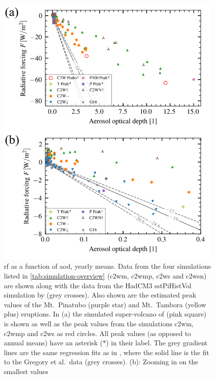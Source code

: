 \documentclass[twocol]{ametsocV6.1}
\begin{document}
\begin{figure}
  \centering
  \includegraphics[width=0.95\linewidth]{figures/aod_vs_toa_avg.png}

  \caption{\gls{rf} as a function of \gls{aod}, yearly means. Data from the four
    simulations listed in \ref{tab:simulation-overview} (\gls{c2wm}, \gls{c2wmp}, \gls{c2ws}
    and \gls{c2wsn}) are shown along with the data from the HadCM3 sstPiHistVol simulation
    by \citet{gregory2016} (grey crosses). Also shown are the estimated peak values of the
    Mt.\ Pinatubo (purple star) and Mt.\ Tambora (yellow plus) eruptions. In
    (a) the simulated super-volcano of \citet{jones2005} (pink
    square) is shown as well as the peak values from the simulations \gls{c2wm}, \gls{c2wmp}
    and \gls{c2ws} as red circles. All peak values (as opposed to annual means) have an
    asterisk (\(\ast{}\)) in their label. The grey gradient lines are the same regression
    fits as in \citet[][Fig.\ 4]{gregory2016}, where the solid line is the fit to the
    Gregory et al.\ data (grey crosses). (b): Zooming in on the
    smallest values}\label{fig:aod_vs_toa_ses_avg}%
\end{figure}
\end{document}
